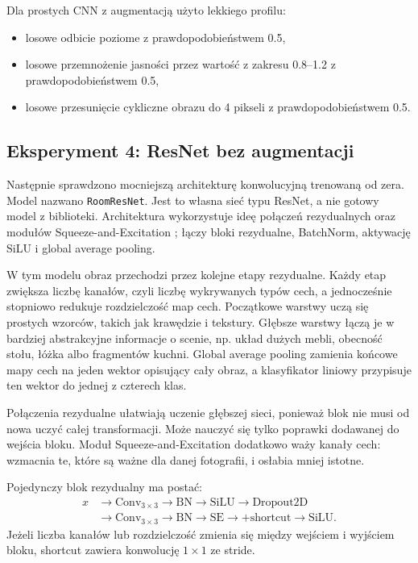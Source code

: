 \documentclass[12pt,a4paper]{article}
\begin{document}
Dla prostych CNN z augmentacją użyto lekkiego profilu:
\begin{itemize}
  \item losowe odbicie poziome z prawdopodobieństwem 0.5,
  \item losowe przemnożenie jasności przez wartość z zakresu 0.8--1.2 z prawdopodobieństwem 0.5,
  \item losowe przesunięcie cykliczne obrazu do 4 pikseli z prawdopodobieństwem 0.5.
\end{itemize}

\subsection{Eksperyment 4: ResNet bez augmentacji}

Następnie sprawdzono mocniejszą architekturę konwolucyjną trenowaną od zera. Model nazwano \texttt{RoomResNet}. Jest to własna sieć typu ResNet, a nie gotowy model z biblioteki. Architektura wykorzystuje ideę połączeń rezydualnych \cite{resnet} oraz modułów Squeeze-and-Excitation \cite{senet}; łączy bloki rezydualne, BatchNorm, aktywację SiLU i global average pooling.

W tym modelu obraz przechodzi przez kolejne etapy rezydualne. Każdy etap zwiększa liczbę kanałów, czyli liczbę wykrywanych typów cech, a jednocześnie stopniowo redukuje rozdzielczość map cech. Początkowe warstwy uczą się prostych wzorców, takich jak krawędzie i tekstury. Głębsze warstwy łączą je w bardziej abstrakcyjne informacje o scenie, np. układ dużych mebli, obecność stołu, łóżka albo fragmentów kuchni. Global average pooling zamienia końcowe mapy cech na jeden wektor opisujący cały obraz, a klasyfikator liniowy przypisuje ten wektor do jednej z czterech klas.

Połączenia rezydualne ułatwiają uczenie głębszej sieci, ponieważ blok nie musi od nowa uczyć całej transformacji. Może nauczyć się tylko poprawki dodawanej do wejścia bloku. Moduł Squeeze-and-Excitation dodatkowo waży kanały cech: wzmacnia te, które są ważne dla danej fotografii, i osłabia mniej istotne.

Pojedynczy blok rezydualny ma postać:
\[
\begin{aligned}
x &\rightarrow \text{Conv}_{3\times3} \rightarrow \text{BN} \rightarrow \text{SiLU}
\rightarrow \text{Dropout2D} \\
  &\rightarrow \text{Conv}_{3\times3} \rightarrow \text{BN}
\rightarrow \text{SE}
\rightarrow +\text{shortcut}
\rightarrow \text{SiLU}.
\end{aligned}
\]
Jeżeli liczba kanałów lub rozdzielczość zmienia się między wejściem i wyjściem bloku, shortcut zawiera konwolucję \(1 \times 1\) ze stride.
\end{document}
